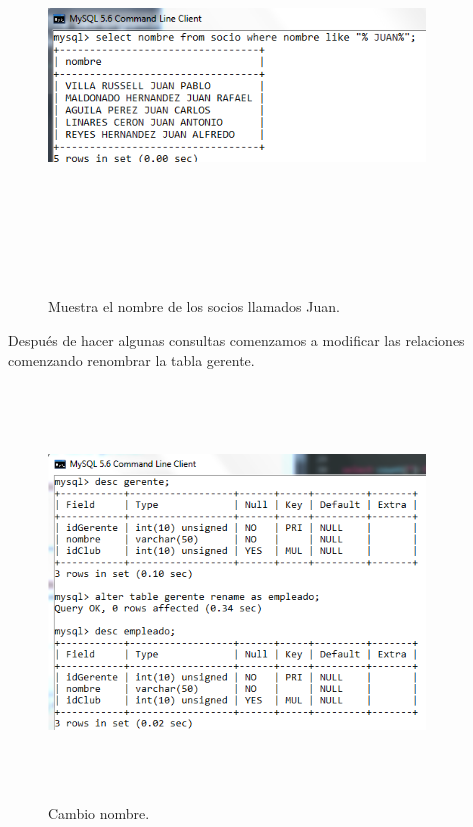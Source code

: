 \documentclass[12pt, titlepage]{article}
\begin{document}
\begin{figure}[H]
    \begin{center}
        \includegraphics[width=10cm, height=11cm]{img/juan.png}
        \caption{Muestra el nombre de los socios llamados Juan.}
        \label{fig:arlter10}
    \end{center}
\end{figure}
Después de hacer algunas consultas comenzamos a modificar las relaciones comenzando renombrar la tabla gerente.
\begin{figure}[H]
    \begin{center}
        \includegraphics[width=10cm, height=11cm]{img/nombre.png}
        \caption{Cambio nombre.}
        \label{fig:arlter77}
    \end{center}
\end{figure}
\end{document}

